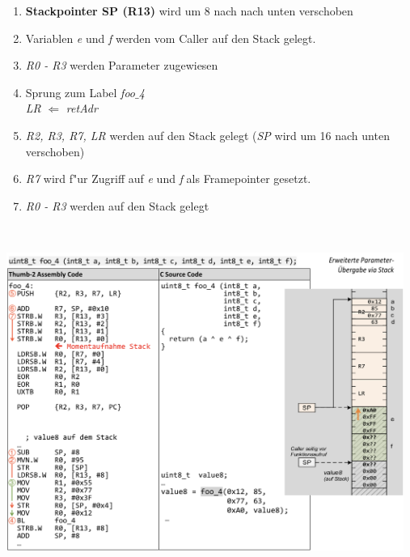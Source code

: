 \begin{minipage}{5cm}
	\begin{enumerate}
		\item \textbf{Stackpointer SP (R13)} wird um 8 nach nach unten verschoben
		\item  Variablen \textit{e} und \textit{f} werden vom Caller auf den Stack gelegt.
		\item \textit{R0 - R3} werden Parameter zugewiesen
		\item Sprung zum Label \textit{foo$\_$4}\\
				\textit{LR} $\Leftarrow$ \textit{retAdr}
		\item \textit{R2, R3, R7, LR} werden auf den Stack gelegt (\textit{SP} wird um 16 nach unten verschoben)
		\item \textit{R7} wird f"ur Zugriff auf \textit{e} und \textit{f} als Framepointer gesetzt.
		\item \textit{R0 - R3} werden auf den Stack gelegt
	\end{enumerate}
\end{minipage}
%
\begin{minipage}{0.25cm}
	\-\
\end{minipage}
%
\begin{minipage}{13cm}
	\includegraphics[width=13cm]{images/parameteruebergabe_stack}
\end{minipage}
\newpage